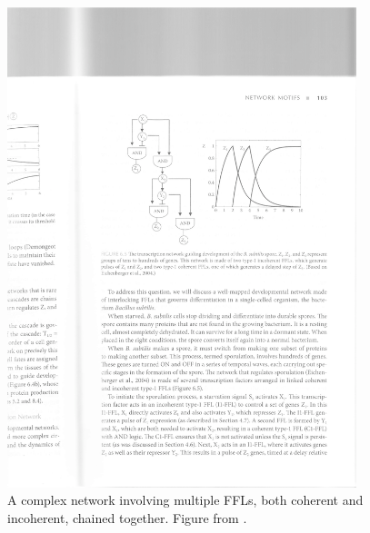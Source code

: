 \documentclass[11pt,letterpaper,oneside,pagesize]{scrartcl}
\begin{document}
\begin{figure}[lht]
\centering
 \includegraphics[width=4in]{multiffl.pdf}
\caption{A complex network involving multiple FFLs, both coherent and incoherent, chained together. Figure from \cite{Alon2007book}.}
\label{fig:multiffl}
\end{figure}
\end{document}
